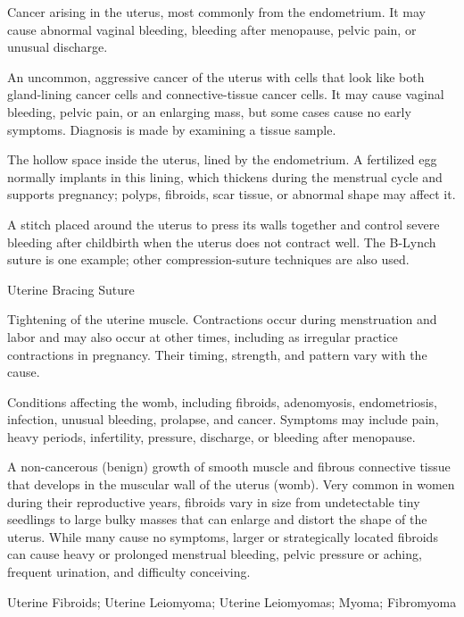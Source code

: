  Cancer arising in the uterus, most commonly from the endometrium. It may cause abnormal vaginal bleeding, bleeding after menopause, pelvic pain, or unusual discharge.

 An uncommon, aggressive cancer of the uterus with cells that
look like both gland-lining cancer cells and connective-tissue cancer cells. It may cause vaginal
bleeding, pelvic pain, or an enlarging mass, but some cases cause no early symptoms. Diagnosis is
made by examining a tissue sample.

 The hollow space inside the uterus, lined by the endometrium. A fertilized egg normally implants in this lining, which thickens during the menstrual cycle and supports pregnancy; polyps, fibroids, scar tissue, or abnormal shape may affect it.

 A stitch placed around the uterus to press its walls together and control severe bleeding after childbirth when the uterus does not contract well. The B-Lynch suture is one example; other compression-suture techniques are also used.

\synonyms
Uterine Bracing Suture

 Tightening of the uterine muscle. Contractions occur during menstruation and labor and may also occur at other times, including as irregular practice contractions in pregnancy. Their timing, strength, and pattern vary with the cause.

 Conditions affecting the womb, including fibroids, adenomyosis, endometriosis, infection, unusual bleeding, prolapse, and cancer. Symptoms may include pain, heavy periods, infertility, pressure, discharge, or bleeding after menopause.

 A non-cancerous (benign) growth of smooth muscle and fibrous connective tissue that develops in the muscular wall of the uterus (womb). Very common in women during their reproductive years, fibroids vary in size from undetectable tiny seedlings to large bulky masses that can enlarge and distort the shape of the uterus. While many cause no symptoms, larger or strategically located fibroids can cause heavy or prolonged menstrual bleeding, pelvic pressure or aching, frequent urination, and difficulty conceiving.

\synonyms
Uterine Fibroids; Uterine Leiomyoma; Uterine Leiomyomas; Myoma; Fibromyoma

